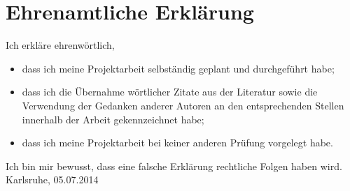 \documentclass{article}
\begin{document}
\newpage
\section{Ehrenamtliche Erklärung}

Ich erkläre ehrenwörtlich,
\begin{itemize}
    \item dass ich meine Projektarbeit selbständig geplant und durchgeführt habe;
    \item dass ich die Übernahme wörtlicher Zitate aus der Literatur sowie die Verwendung der Gedanken anderer Autoren an den entsprechenden Stellen innerhalb der Arbeit gekennzeichnet habe;
    \item dass ich meine Projektarbeit bei keiner anderen Prüfung
    vorgelegt habe.
\end{itemize}
Ich bin mir bewusst, dass eine falsche Erklärung rechtliche Folgen haben wird. \\

\vspace{1cm}
Karlsruhe, 05.07.2014 
\end{document}
